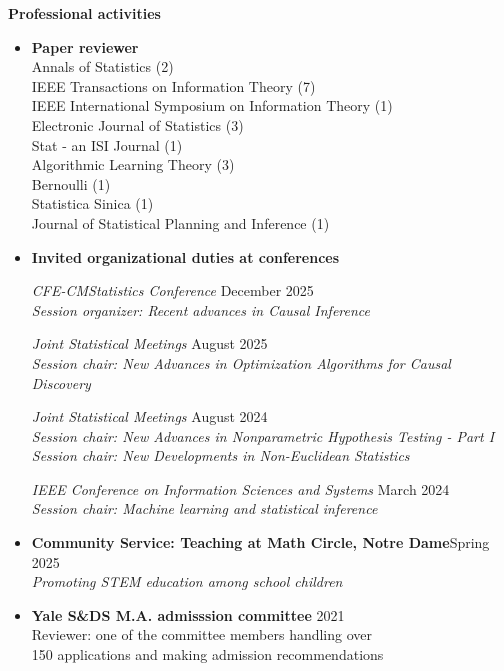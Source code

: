 \documentclass[letterpaper,12pt,oneside]{article}
\theoremstyle{definition}
\begin{document}
			
			\noindent \textbf{Professional activities}
			\begin{itemize}
				\item[]
				{\bf Paper reviewer}\\
				Annals of Statistics (2)\\
				IEEE Transactions on Information Theory (7)\\
				IEEE International Symposium on Information Theory (1)\\
				Electronic Journal of Statistics (3)\\
				Stat - an ISI Journal (1)\\
				Algorithmic Learning Theory (3)\\
				Bernoulli (1)\\
				Statistica Sinica (1)\\
				Journal of Statistical Planning and Inference (1)
				
				\item[] 
				{\bf Invited organizational duties at conferences}
				
				
				
				{\it CFE-CMStatistics Conference} \hfill December 2025\\
				{\it Session organizer: Recent advances in Causal Inference}
				
				{\it Joint Statistical Meetings} \hfill August 2025\\
				{\it Session chair: New Advances in Optimization Algorithms for Causal Discovery}
				
				
				{\it Joint Statistical Meetings} \hfill August 2024\\
				{\it Session chair: New Advances in Nonparametric Hypothesis Testing - Part I}\\
				{\it Session chair: New Developments in Non-Euclidean Statistics}
				
				{\it IEEE Conference on Information Sciences and Systems} \hfill March 2024\\
				{\it  Session chair: Machine learning and statistical inference}
				
				\item[] \textbf{Community Service: Teaching at Math Circle, Notre Dame}\hfill Spring 2025\\
				{\it Promoting STEM education among school children}
				
				
				\item[] {\bf Yale S\&DS M.A. admisssion committee} \hfill 2021\\
				Reviewer: one of the committee members
				handling over\\ 150 applications
				and making admission recommendations
				

\end{itemize}
\end{document}
